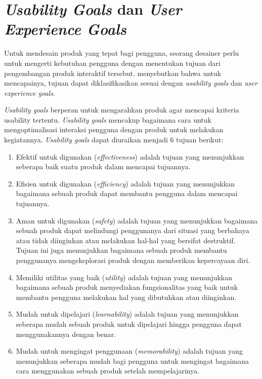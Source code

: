 \section{\textit{Usability Goals} dan \textit{User Experience Goals}}
Untuk mendesain produk yang tepat bagi pengguna, seorang desainer perlu untuk mengerti kebutuhan pengguna dengan menentukan tujuan dari pengembangan produk interaktif tersebut. \textcite{saffer2010designing} menyebutkan bahwa untuk mencapainya, tujuan dapat diklasifikasikan sesuai dengan \textit{usability goals} dan \textit{user experience goals}.



\textit{Usability goals} berperan untuk mengarahkan produk agar mencapai kriteria usability tertentu. \textit{Usability goals} mencakup bagaimana cara untuk mengoptimalisasi interaksi pengguna dengan produk untuk melakukan kegiatannya. \textit{Usability goals} dapat diuraikan menjadi 6 tujuan berikut:
\begin{enumerate}
  \item Efektif untuk digunakan (\textit{effectiveness}) adalah tujuan yang menunjukkan seberapa baik suatu produk dalam mencapai tujuannya.
  \item Efisien untuk digunakan (\textit{efficiency}) adalah tujuan yang menunjukkan bagaimana sebuah produk dapat membantu pengguna dalam mencapai tujuannya.
  \item Aman untuk digunakan (\textit{safety}) adalah tujuan yang menunjukkan bagaimana sebuah produk dapat melindungi penggunanya dari situasi yang berbahaya atau tidak diinginkan atau melakukan hal-hal yang bersifat destruktif. Tujuan ini juga menunjukkan bagaimana sebuah produk membantu penggunanya mengeksplorasi produk dengan memberikan kepercayaan diri.
  \item Memiliki utilitas yang baik (\textit{utility}) adalah tujuan yang menunjukkan bagaimana sebuah produk menyediakan fungsionalitas yang baik untuk membantu pengguna melakukan hal yang dibutuhkan atau diinginkan.
  \item Mudah untuk dipelajari (\textit{learnability}) adalah tujuan yang menunjukkan seberapa mudah sebuah produk untuk dipelajari hingga pengguna dapat menggunakannya dengan benar.
  \item Mudah untuk mengingat penggunaan (\textit{memorability}) adalah tujuan yang menunjukkan seberapa mudah bagi pengguna untuk mengingat bagaimana cara menggunakan sebuah produk setelah mempelajarinya.
\end{enumerate}


